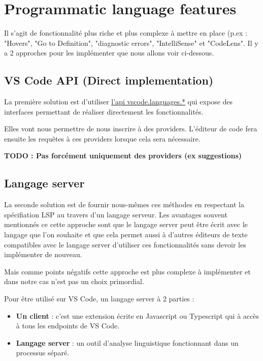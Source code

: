 \documentclass[
    iict, %
    il, %
]{heig-tb}
\begin{document}
\section{Programmatic language features}\label{Programmatic language features}
Il s'agit de fonctionnalité plus riche et plus complexe à mettre en place (p.ex : "Hovers", "Go to Definition", "diagnostic errors", "IntelliSense" \space et "CodeLens".
Il y a 2 approches pour les implémenter que nous allons voir ci-dessous.

\subsection{VS Code API (Direct implementation)}
La première solution est d'utiliser \href{https://code.visualstudio.com/api/references/vscode-api#languages}{l'api vscode.languages.*} qui expose des interfaces
permettant de réaliser directement les fonctionnalités.

Elles vont nous permettre de nous inscrire à des providers. L'éditeur de code fera ensuite les requêtes à ces providers lorsque cela sera nécessaire.

\textbf{TODO : Pas forcément uniquement des providers (ex suggestions)}

\subsection{Langage server}
La seconde solution est de fournir nous-mêmes ces méthodes en respectant la spécifiation LSP \cite{lsp-specification} au travers d'un langage serveur.
Les avantages souvent mentionnés ce cette approche sont que le langage server peut être écrit avec le langage que l'on souhaite et
que cela permet aussi à d'autres éditeurs de texte compatibles avec le langage server d'utiliser ces fonctionnalités sans devoir les implémenter de nouveau.

Mais comme points négatifs cette approche est plus complexe à implémenter et dans notre cas n'est pas un choix primordial.

Pour être utilisé sur VS Code, un langage server à 2 parties :
\begin{itemize}
    \item \textbf{Un client} : c'est une extension écrite en Javascript ou Typescript qui à accès à tous les endpoints de VS Code.
    \item \textbf{Langage server} : un outil d'analyse linguistique fonctionnant dans un processus séparé.
\end{itemize}
\end{document}
